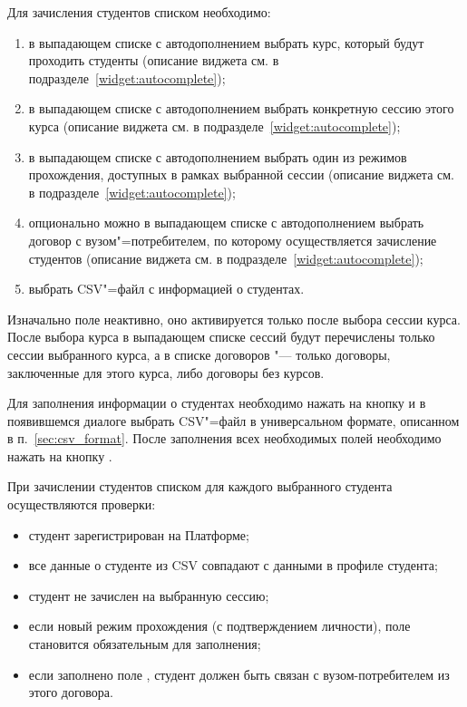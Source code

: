 Для зачисления студентов списком необходимо:
\begin{enumerate}
	\item в выпадающем списке с автодополнением выбрать курс, который будут проходить студенты 
	(описание виджета см. в подразделе~\ref{widget:autocomplete});
	\item в выпадающем списке с автодополнением выбрать конкретную сессию этого курса 
	(описание виджета см. в подразделе~\ref{widget:autocomplete});
	\item в выпадающем списке с автодополнением выбрать один из режимов прохождения, доступных в рамках выбранной сессии 
	(описание виджета см. в подразделе~\ref{widget:autocomplete});
	\item опционально можно в выпадающем списке с автодополнением выбрать договор с вузом"=потребителем, 
	по которому осуществляется зачисление студентов (описание виджета см. в подразделе~\ref{widget:autocomplete});
	\item выбрать CSV"=файл с информацией о студентах. 
\end{enumerate}

Изначально поле  неактивно, оно активируется только после выбора сессии курса.
После выбора курса в выпадающем списке сессий будут перечислены только сессии выбранного курса, 
а в списке договоров "--- только договоры, заключенные для этого курса, либо договоры без курсов.

Для заполнения информации о студентах необходимо нажать на кнопку  и в появившемся диалоге выбрать CSV"=файл в универсальном формате, описанном в п.~\ref{sec:csv_format}. 
После заполнения всех необходимых полей необходимо нажать на кнопку .

При зачислении студентов списком для каждого выбранного студента осуществляются проверки:
\begin{itemize}
	\item студент зарегистрирован на Платформе;
	\item все данные о студенте из CSV совпадают с данными в профиле студента;
	\item студент не зачислен на выбранную сессию;
	\item если новый режим прохождения  (с подтверждением личности), поле  
	становится обязательным для заполнения; 
	\item если заполнено поле , студент должен быть связан с вузом-потребителем из этого договора.
\end{itemize}

